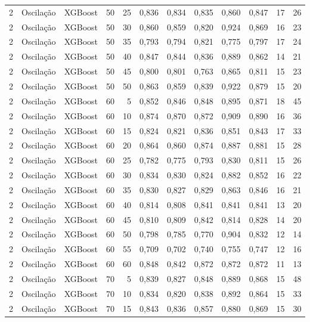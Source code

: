 \begin{longtable}{ccclrrrrrrrr}
2 & Oscilação & XGBoost & 50 & 25 & 0,836 & 0,834 & 0,835 & 0,860 & 0,847 & 17 & 26 \\
2 & Oscilação & XGBoost & 50 & 30 & 0,860 & 0,859 & 0,820 & 0,924 & 0,869 & 16 & 23 \\
2 & Oscilação & XGBoost & 50 & 35 & 0,793 & 0,794 & 0,821 & 0,775 & 0,797 & 17 & 24 \\
2 & Oscilação & XGBoost & 50 & 40 & 0,847 & 0,844 & 0,836 & 0,889 & 0,862 & 14 & 21 \\
2 & Oscilação & XGBoost & 50 & 45 & 0,800 & 0,801 & 0,763 & 0,865 & 0,811 & 15 & 23 \\
2 & Oscilação & XGBoost & 50 & 50 & 0,863 & 0,859 & 0,839 & 0,922 & 0,879 & 15 & 20 \\
2 & Oscilação & XGBoost & 60 & 5 & 0,852 & 0,846 & 0,848 & 0,895 & 0,871 & 18 & 45 \\
2 & Oscilação & XGBoost & 60 & 10 & 0,874 & 0,870 & 0,872 & 0,909 & 0,890 & 16 & 36 \\
2 & Oscilação & XGBoost & 60 & 15 & 0,824 & 0,821 & 0,836 & 0,851 & 0,843 & 17 & 33 \\
2 & Oscilação & XGBoost & 60 & 20 & 0,864 & 0,860 & 0,874 & 0,887 & 0,881 & 15 & 28 \\
2 & Oscilação & XGBoost & 60 & 25 & 0,782 & 0,775 & 0,793 & 0,830 & 0,811 & 15 & 26 \\
2 & Oscilação & XGBoost & 60 & 30 & 0,834 & 0,830 & 0,824 & 0,882 & 0,852 & 16 & 22 \\
2 & Oscilação & XGBoost & 60 & 35 & 0,830 & 0,827 & 0,829 & 0,863 & 0,846 & 16 & 21 \\
2 & Oscilação & XGBoost & 60 & 40 & 0,814 & 0,808 & 0,841 & 0,841 & 0,841 & 13 & 20 \\
2 & Oscilação & XGBoost & 60 & 45 & 0,810 & 0,809 & 0,842 & 0,814 & 0,828 & 14 & 20 \\
2 & Oscilação & XGBoost & 60 & 50 & 0,798 & 0,785 & 0,770 & 0,904 & 0,832 & 12 & 14 \\
2 & Oscilação & XGBoost & 60 & 55 & 0,709 & 0,702 & 0,740 & 0,755 & 0,747 & 12 & 16 \\
2 & Oscilação & XGBoost & 60 & 60 & 0,848 & 0,842 & 0,872 & 0,872 & 0,872 & 11 & 13 \\
2 & Oscilação & XGBoost & 70 & 5 & 0,839 & 0,827 & 0,848 & 0,889 & 0,868 & 15 & 48 \\
2 & Oscilação & XGBoost & 70 & 10 & 0,834 & 0,820 & 0,838 & 0,892 & 0,864 & 15 & 33 \\
2 & Oscilação & XGBoost & 70 & 15 & 0,843 & 0,836 & 0,857 & 0,880 & 0,869 & 15 & 30 \\

\end{longtable}
